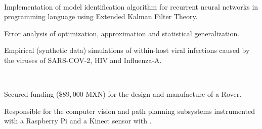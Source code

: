 \documentclass[]{tex/deedy-resume-openfont}
\begin{document}
\begin{minipage}[t]{0.66\textwidth}
\\
\vspace{\topsep} %
\begin{tightemize}
    \item Implementation of model identification algorithm for recurrent neural networks in  programming language using Extended Kalman Filter Theory.
    \item Error analysis of optimization, approximation and statistical generalization. 
    \item Empirical (synthetic data) simulations of within-host viral infections caused by the viruses of SARS-COV-2, HIV and Influenza-A.
\end{tightemize}
\sectionsep

\\
\vspace{\topsep} %
\begin{tightemize}
    \item Secured funding ($\$89,000$ MXN) for the design and manufacture of a Rover.
    \item Responsible for the computer vision and path planning subsystems instrumented with a Raspberry Pi and a Kinect sensor with . 
\end{tightemize}


\end{minipage} 
\end{document}
